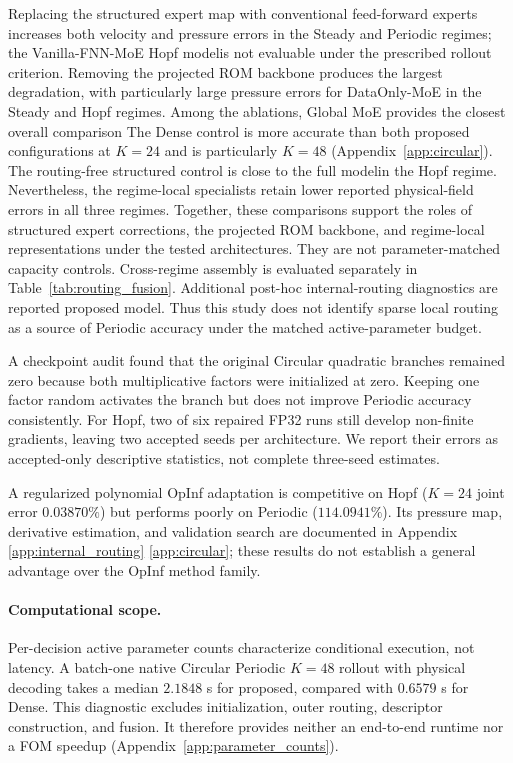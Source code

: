 \documentclass{article}
\providecommand{\DIFaddtex}[1]{{\protect\color{blue} \sf #1}} %
\providecommand{\DIFdeltex}[1]{{\protect\color{red} \scriptsize #1}} %
\providecommand{\DIFaddbegin}{} %
\providecommand{\DIFaddend}{} %
\providecommand{\DIFdelbegin}{} %
\providecommand{\DIFdelend}{} %
\providecommand{\DIFadd}[1]{\texorpdfstring{\DIFaddtex{#1}}{#1}} %
\providecommand{\DIFdel}[1]{\texorpdfstring{\DIFdeltex{#1}}{}} %
\begin{document}
\DIFdelbegin \DIFdel{Replacing the structured expert map with conventional feed-forward experts increases both velocity and
pressure errors in the Steady and Periodic regimes; the Vanilla-FNN-MoE Hopf modelis not evaluable under the prescribed rollout criterion. Removing the projected ROM backbone produces the largest degradation, with particularly large pressure errors for DataOnly-MoE in the Steady and Hopf regimes. Among the ablations, Global MoE provides the closest overall comparison}\DIFdelend \DIFaddbegin \DIFadd{The Dense control is more accurate than both proposed configurations at
$K=24$ }\DIFaddend and \DIFdelbegin \DIFdel{is particularly }\DIFdelend \DIFaddbegin \DIFadd{$K=48$ (Appendix~\ref{app:circular}). The routing-free
structured control is }\DIFaddend close to the \DIFdelbegin \DIFdel{full modelin the Hopf regime.
Nevertheless, the regime-local specialists retain lower reported physical-field errors in all three regimes. Together, these comparisons support the roles of structured expert corrections, the projected ROM backbone, and regime-local representations under the tested architectures. They are not parameter-matched capacity controls.
Cross-regime assembly is evaluated separately in Table~\ref{tab:routing_fusion}. Additional post-hoc internal-routing diagnostics are reported }\DIFdelend \DIFaddbegin \DIFadd{proposed model. Thus this study does
not identify sparse local routing as a source of Periodic accuracy under
the matched active-parameter budget.
}

\DIFadd{A checkpoint audit found that the original Circular quadratic branches
remained zero because both multiplicative factors were initialized at
zero. Keeping one factor random activates the branch but does not improve
Periodic accuracy consistently. For Hopf, two of six repaired FP32 runs
still develop non-finite gradients, leaving two accepted seeds per
architecture. We report their errors as accepted-only descriptive
statistics, not complete three-seed estimates.
}

\DIFadd{A regularized polynomial OpInf adaptation is competitive on Hopf
($K=24$ joint error $0.03870\%$) but performs poorly on Periodic
($114.0941\%$). Its pressure map, derivative estimation, and validation
search are documented }\DIFaddend in Appendix~\DIFdelbegin \DIFdel{\ref{app:internal_routing}}\DIFdelend \DIFaddbegin \DIFadd{\ref{app:circular}; these results do
not establish a general advantage over the OpInf method family}\DIFaddend .

\DIFaddbegin \paragraph{\DIFadd{Computational scope.}}
\DIFadd{Per-decision active parameter counts characterize conditional execution,
not latency. A batch-one native Circular Periodic $K=48$ rollout with
physical decoding takes a median $2.1848$ s for proposed, compared with
$0.6579$ s for Dense. This diagnostic excludes initialization, outer
routing, descriptor construction, and fusion. It therefore provides
neither an end-to-end runtime nor a FOM speedup
(Appendix~\ref{app:parameter_counts}).
}
\end{document}
